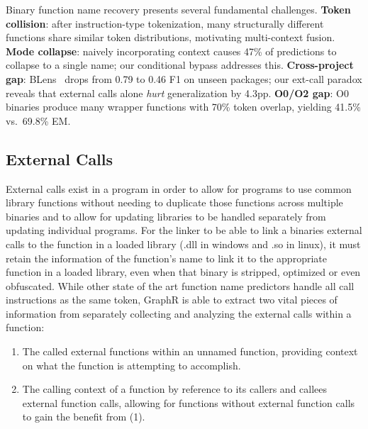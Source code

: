 \documentclass[sigconf,nonacm]{acmart}
\begin{document}
Binary function name recovery presents several fundamental challenges. \textbf{Token collision}: after instruction-type tokenization, many structurally different functions share similar token distributions, motivating multi-context fusion. \textbf{Mode collapse}: naively incorporating context causes 47\% of predictions to collapse to a single name; our conditional bypass addresses this. \textbf{Cross-project gap}: BLens~\cite{blens} drops from 0.79 to 0.46 F1 on unseen packages; our ext-call paradox reveals that external calls alone \emph{hurt} generalization by 4.3pp. \textbf{O0/O2 gap}: O0 binaries produce many wrapper functions with 70\% token overlap, yielding 41.5\% vs.\ 69.8\% EM.

\subsection{External Calls}
\label{sec:external}
External calls exist in a program in order to allow for programs to use common library functions without needing to duplicate those functions across multiple binaries and to allow for updating libraries to be handled separately from updating individual programs. For the linker to be able to link a binaries external calls to the function in a loaded library (.dll in windows and .so in linux), it must retain the information of the function's name to link it to the appropriate function in a loaded library, even when that binary is stripped, optimized or even obfuscated. While other state of the art function name predictors handle all call instructions as the same token, GraphR is able to extract two vital pieces of information from separately collecting and analyzing the external calls within a function:

\begin{enumerate}
    \item The called external functions within an unnamed function, providing context on what the function is attempting to accomplish. %
    \item The calling context of a function by reference to its callers and callees external function calls, allowing for functions without external function calls to gain the benefit from (1). 
\end{enumerate}
\end{document}
